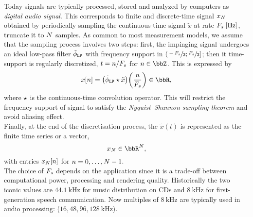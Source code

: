 \mynewline
Today signals are typically processed, stored and analyzed by computers as \textit{digital audio signal}.
This corresponds to finite and discrete-time signal $x_{N}$ obtained by periodically sampling the continuous-time signal $\tilde{x}$ at rate $\Fs\;[\si{\Hz}]$, truncate it to $N$ samples.
As common to most measurement models, we assume that the sampling process involves two steps:
first, the impinging signal undergoes an ideal low-pass filter $\lowpassfilter$ with frequency support in $\kintervoc{\sfrac{-\Fs}{2}}{\sfrac{\Fs}{2}}$;
then it time-support is regularly discretized, $t = n/F_s$ for $n \in \Z$.
This is expressed by
\begin{equation}\label{eq:processing:sampling}
    \mic[\idxSample] = \kparen{\lowpassfilter \convCont \tilde{x}}\kparen{\frac{n}{\Fs}} \in \R
    ,
\end{equation}
where $\star$ is the continuous-time convolution operator.
This will restrict the frequency support of signal to satisfy the \textit{Nyquist–Shannon sampling theorem} and avoid aliasing effect.
\\Finally, at the end of the discretisation process, the $\tilde{x}(t)$ is represented as the finite time series or a vector,
\begin{equation}
    \mic_{\numSample} \in \R^{\numSample}
    ,
\end{equation}
with entries $x_{N}[n]$ for $n = 0, \ldots, N-1$.
\\The choice of $F_s$ depends on the application since it is a trade-off between computational power, processing and rendering quality.
Historically the two iconic values are $\SI{44.1}{\kHz}$ for music distribution on CDs and $\SI{8}{\kHz}$ for first-generation speech communication.
Now multiples of $\SI{8}{\kHz}$ are typically used in audio processing: ($16, 48, 96, \SI{128}{\kHz}$).

